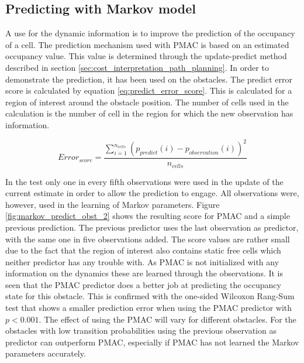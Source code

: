 
\subsection{Predicting with Markov model}

A use for the dynamic information is to improve the prediction of the occupancy of a cell. The prediction mechanism used with PMAC is based on an estimated occupancy value. This value is determined through the update-predict method described in section \vref{sec:cost_interpretation_path_planning}. 
In order to demonstrate the prediction, it has been used on the obstacles. The predict error score is calculated by equation \ref{eq:predict_error_score}. This is calculated for a region of interest around the obstacle position. The number of cells used in the calculation is the number of cell in the region for which the new observation has information. 

\begin{equation}
	Error_{score} = \frac{\sum\limits_{i=1}^{n_{cells}} (p_{predict}(i)-p_{observation}(i))^2}{n_{cells}}
	\label{eq:predict_error_score}
\end{equation} 

In the test only one in every fifth observations were used in the update of the current estimate in order to allow the prediction to engage. All observations were, however, used in the learning of Markov parameters. Figure \ref{fig:markov_predict_obst_2} shows the resulting score for PMAC and a simple previous prediction. The previous predictor uses the last observation as predictor, with the same one in five observations added. The score values are rather small due to the fact that the region of interest also contains static free cells which neither predictor has any trouble with. As PMAC is not initialized with any information on the dynamics these are learned through the observations. 
It is seen that the PMAC predictor does a better job at predicting the occupancy state for this obstacle. 
This is confirmed with the one-sided Wilcoxon Rang-Sum test that shows a smaller prediction error when using the PMAC predictor with $p<0.001$.
The effect of using the PMAC will vary for different obstacles. For the obstacles with low transition probabilities using the previous observation as predictor can outperform PMAC, especially if PMAC has not learned the Markov parameters accurately. 

